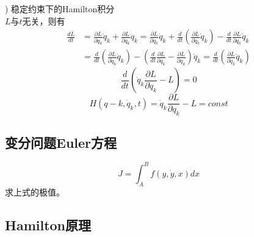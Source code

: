 \documentclass[12pt]{article}
\numberwithin{equation}{section}
\begin{document}
        ) 稳定约束下的Hamilton积分\\
        $L$与$t$无关，则有
        \begin{equation}
            \begin{aligned}
                \frac{dL}{dt}&=\frac{\partial L}{\partial q_k}\dot{q}_k+\frac{\partial L}{\partial q_k}\ddot{q}_k
                =\frac{\partial L}{\partial q_k}\dot{q}_k+\frac{d}{dt}\left( \frac{\partial L}{\partial \dot{q}_k}\dot{q}_k \right)
                -\frac{d}{dt}\frac{\partial L}{\partial q_k}\dot{q}_k\\
                &=\frac{d}{dt}\left( \frac{\partial L}{\partial \dot{q}_k}\dot{q}_k \right)
                -\left( \frac{d}{dt}\frac{\partial L}{\partial q_k}-\frac{\partial L}{\partial q_k} \right)\dot{q}_k
                =\frac{d}{dt}\left( \frac{\partial L}{\partial \dot{q}_k}\dot{q}_k \right)
            \end{aligned}
        \end{equation}
        \begin{equation}
           \frac{d}{dt}\left( \dot{q}_k\frac{\partial L}{\partial \dot{q}_k}-L \right)=0 
        \end{equation}
        \begin{equation}
           H(q-k,\dot{q}_k,t)=\dot{q}_k\frac{\partial L}{\partial \dot{q}_k}-L=const 
        \end{equation}

        \subsection{变分问题Euler方程}
        \begin{equation}
            J=\int_A^Bf(y,\dot{y},x)dx
        \end{equation}
        求上式的极值。

        \subsection{Hamilton原理}
        
    
\end{document}

